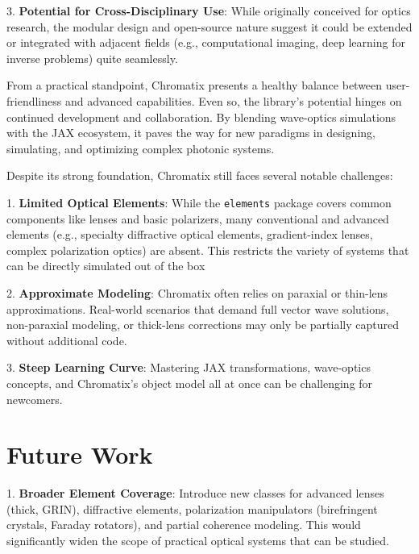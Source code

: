\documentclass[a4paper,12pt]{report}
\begin{document}
\vspace{0.5em}
3. \textbf{Potential for Cross-Disciplinary Use}: While originally conceived for optics research, the modular design and open-source nature suggest it could be extended or integrated with adjacent fields (e.g., computational imaging, deep learning for inverse problems) quite seamlessly.

\vspace{0.5em}
From a practical standpoint, Chromatix presents a healthy balance between user-friendliness and advanced capabilities. Even so, the library’s potential hinges on continued development and collaboration. By blending wave-optics simulations with the JAX ecosystem, it paves the way for new paradigms in designing, simulating, and optimizing complex photonic systems.

\vspace{0.5em}
Despite its strong foundation, Chromatix still faces several notable challenges:

\vspace{0.5em}
1. \textbf{Limited Optical Elements}: While the \texttt{elements} package covers common components like lenses and basic polarizers, many conventional and advanced elements (e.g., specialty diffractive optical elements, gradient-index lenses, complex polarization optics) are absent. This restricts the variety of systems that can be directly simulated out of the box

\vspace{0.5em}
2. \textbf{Approximate Modeling}: Chromatix often relies on paraxial or thin-lens approximations. Real-world scenarios that demand full vector wave solutions, non-paraxial modeling, or thick-lens corrections may only be partially captured without additional code.

\vspace{0.5em}
3. \textbf{Steep Learning Curve}: Mastering JAX transformations, wave-optics concepts, and Chromatix’s object model all at once can be challenging for newcomers.

\section{Future Work}
1. \textbf{Broader Element Coverage}: Introduce new classes for advanced lenses (thick, GRIN), diffractive elements, polarization manipulators (birefringent crystals, Faraday rotators), and partial coherence modeling. This would significantly widen the scope of practical optical systems that can be studied.
\end{document}
